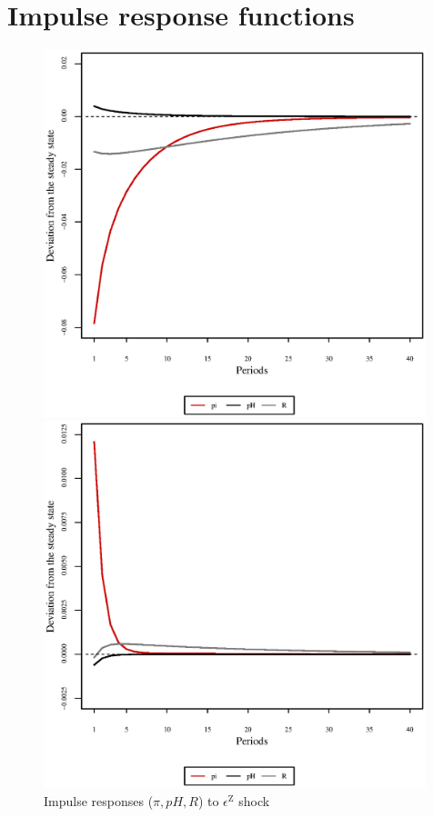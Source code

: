 \pagebreak

\section{Impulse response functions}

\begin{figure}[h]
\begin{minipage}{0.5\textwidth}
\vspace*{-3em}
\centering
\includegraphics[width=0.99\textwidth, scale=0.55]{plots/plot_66.eps}
\caption{Impulse responses ($\pi, {p\!H}, R$) to $\epsilon^{\mathrm{Z}}$ shock}
\end{minipage}
\begin{minipage}{0.5\textwidth}
\vspace*{-3em}
\centering
\includegraphics[width=0.99\textwidth, scale=0.55]{plots/plot_67.eps}

\end{minipage}
\end{figure}
